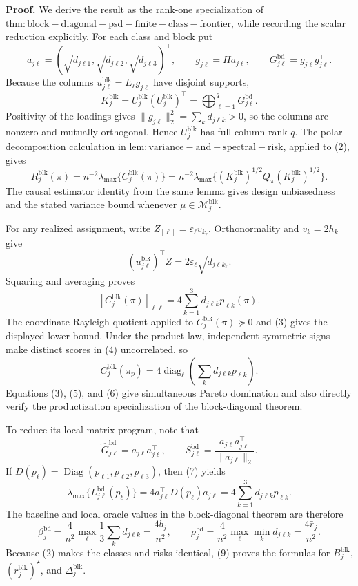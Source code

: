 \textbf{Proof.}
We derive the result as the rank-one specialization of \(\mathrm{thm:block-diagonal-psd-finite-class-frontier}\), while recording the scalar reduction explicitly.  For each class and block put
\[
a_{j\ell}=(\sqrt{d_{j\ell1}},\sqrt{d_{j\ell2}},\sqrt{d_{j\ell3}})^\top,
\qquad
g_{j\ell}=Ha_{j\ell},
\qquad
G^{\mathrm{bd}}_{j\ell}=g_{j\ell}g_{j\ell}^\top.
\tag{1}
\]
Because the columns \(u^{\mathrm{blk}}_{j\ell}=E_\ell g_{j\ell}\) have disjoint supports,
\[
K_j^{\mathrm{blk}}
=U_j^{\mathrm{blk}}(U_j^{\mathrm{blk}})^\top
=\bigoplus_{\ell=1}^qG^{\mathrm{bd}}_{j\ell}.
\tag{2}
\]
Positivity of the loadings gives \(\|g_{j\ell}\|_2^2=\sum_kd_{j\ell k}>0\), so the columns are nonzero and mutually orthogonal. Hence \(U_j^{\mathrm{blk}}\) has full column rank \(q\).  The polar-decomposition calculation in \(\mathrm{lem:variance-and-spectral-risk}\), applied to (2), gives
\[
R_j^{\mathrm{blk}}(\pi)
=n^{-2}\lambda_{\max}\{C_j^{\mathrm{blk}}(\pi)\}
=n^{-2}\lambda_{\max}\{(K_j^{\mathrm{blk}})^{1/2}Q_\pi(K_j^{\mathrm{blk}})^{1/2}\}.
\tag{3}
\]
The causal estimator identity from the same lemma gives design unbiasedness and the stated variance bound whenever \(\mu\in\mathcal M_j^{\mathrm{blk}}\).

For any realized assignment, write \(Z_{[\ell]}=\varepsilon_\ell v_{k_\ell}\).  Orthonormality and \(v_k=2h_k\) give
\[
(u_{j\ell}^{\mathrm{blk}})^\top Z
=2\varepsilon_\ell\sqrt{d_{j\ell k_\ell}}.
\tag{4}
\]
Squaring and averaging proves
\[
[C_j^{\mathrm{blk}}(\pi)]_{\ell\ell}
=4\sum_{k=1}^3d_{j\ell k}p_{\ell k}(\pi).
\tag{5}
\]
The coordinate Rayleigh quotient applied to \(C_j^{\mathrm{blk}}(\pi)\succeq0\) and (3) gives the displayed lower bound.  Under the product law, independent symmetric signs make distinct scores in (4) uncorrelated, so
\[
C_j^{\mathrm{blk}}(\pi_p)
=4\operatorname{diag}_\ell\left(\sum_kd_{j\ell k}p_{\ell k}\right).
\tag{6}
\]
Equations (3), (5), and (6) give simultaneous Pareto domination and also directly verify the productization specialization of the block-diagonal theorem.

To reduce its local matrix program, note that
\[
\widehat G^{\mathrm{bd}}_{j\ell}=a_{j\ell}a_{j\ell}^\top,
\qquad
S^{\mathrm{bd}}_{j\ell}
=\frac{a_{j\ell}a_{j\ell}^\top}{\|a_{j\ell}\|_2}.
\tag{7}
\]
If \(D(p_\ell)=\operatorname{Diag}(p_{\ell1},p_{\ell2},p_{\ell3})\), then (7) yields
\[
\lambda_{\max}\{L^{\mathrm{bd}}_{j\ell}(p_\ell)\}
=4a_{j\ell}^\top D(p_\ell)a_{j\ell}
=4\sum_{k=1}^3d_{j\ell k}p_{\ell k}.
\tag{8}
\]
The baseline and local oracle values in the block-diagonal theorem are therefore
\[
\beta_j^{\mathrm{bd}}
=\frac4{n^2}\max_\ell\frac13\sum_kd_{j\ell k}
=\frac{4b_j}{n^2},
\qquad
\rho_j^{\mathrm{bd}}
=\frac4{n^2}\max_\ell\min_kd_{j\ell k}
=\frac{4\bar r_j}{n^2}.
\tag{9}
\]
Because (2) makes the classes and risks identical, (9) proves the formulas for \(B_j^{\mathrm{blk}}\), \((r_j^{\mathrm{blk}})^\star\), and \(\Delta_j^{\mathrm{blk}}\).

